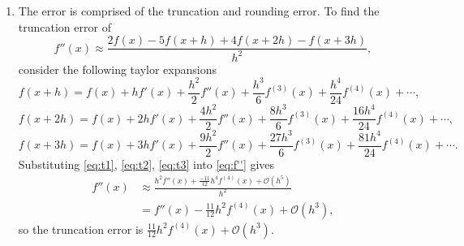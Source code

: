 \documentclass[a4paper,11pt]{article}
\begin{document}
\begin{enumerate}
\begin{enumerate}
		\item The error is comprised of the truncation and rounding error. To 
		find the truncation error of 
		\begin{equation}
			f''(x) \approx \frac{2f(x)-5f(x+h)+4f(x+2h)-f(x+3h)}{h^{2}},
			\label{eq:f''}
		\end{equation}
		consider the following taylor expansions
		\begin{equation}
			f(x + h) = f(x) + hf'(x) + \frac{h^{2}}{2}f''(x) + 
			\frac{h^{3}}{6}f^{(3)}(x) + \frac{h^{4}}{24}f^{(4)}(x) + \cdots,
			\label{eq:t1}
		\end{equation}
		\begin{equation}
			f(x + 2h) = f(x) + 2hf'(x) + \frac{4h^{2}}{2}f''(x) + 
			\frac{8h^{3}}{6}f^{(3)}(x) + \frac{16h^{4}}{24}f^{(4)}(x) + 
			\cdots,
			\label{eq:t2}
		\end{equation}
		\begin{equation}
			f(x + 3h) = f(x) + 3hf'(x) + \frac{9h^{2}}{2}f''(x) + 
			\frac{27h^{3}}{6}f^{(3)}(x) + \frac{81h^{4}}{24}f^{(4)}(x) + 
			\cdots.
			\label{eq:t3}
		\end{equation}
		Substituting \eqref{eq:t1}, \eqref{eq:t2}, \eqref{eq:t3} into 
		\eqref{eq:f''} gives
		\begin{align}
			f''(x) &\approx \frac{h^{2}f''(x) + 
			\frac{-11}{12}h^{4}f^{(4)}(x) + \mathcal{O}(h^{5})}{h^{2}}\\
			&= f''(x) - \frac{11}{12}h^{2}f^{(4)}(x) + 
			\mathcal{O}(h^{3}),
		\end{align}
		so the truncation error is $\frac{11}{12}h^{2}f^{(4)}(x) + 
		\mathcal{O}(h^{3})$.
		

\end{enumerate}
\end{enumerate}
\end{document}
